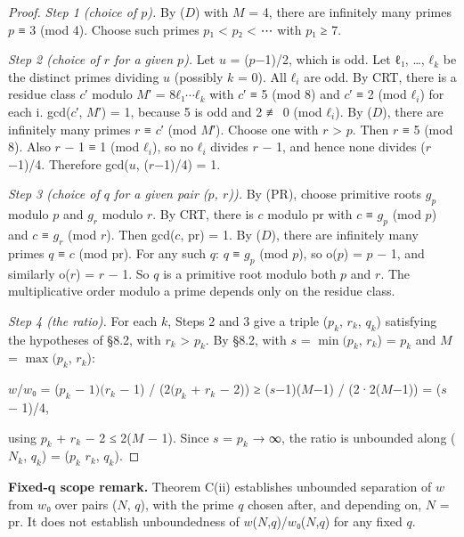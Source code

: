 \documentclass[pdflatex,sn-mathphys-num]{sn-jnl}
\theoremstyle{thmstyleone}
\theoremstyle{thmstylethree}
\begin{document}
\begin{proof}[Proof]

\emph{Step 1 (choice of \(p\)).} By (\(D\)) with \(M\) = 4, there are infinitely many primes \(p\) ≡ 3 (mod 4). Choose such primes \(p\)₁ \textless{} \(p\)₂ \textless{} ⋯ with \(p\)₁ ≥ 7.

\emph{Step 2 (choice of \(r\) for a given \(p\)).} Let \(u\) = (\(p\)−1)/2, which is odd. Let ℓ₁, \ldots, \(ℓ_k\) be the distinct primes dividing \(u\) (possibly \(k\) = 0). All \(ℓ_i\) are odd. By CRT, there is a residue class \(c\)′ modulo \(M\)′ = \(8ℓ₁⋯ℓ_k\) with \(c\)′ ≡ 5 (mod 8) and \(c\)′ ≡ 2 (mod \(ℓ_i\)) for each i. gcd(\(c\)′, \(M\)′) = 1, because 5 is odd and 2 ≢ 0 (mod \(ℓ_i\)). By (\(D\)), there are infinitely many primes \(r\) ≡ \(c\)′ (mod \(M\)′). Choose one with \(r\) \textgreater{} \(p\). Then \(r\) ≡ 5 (mod 8). Also \(r\) − 1 ≡ 1 (mod \(ℓ_i\)), so no \(ℓ_i\) divides \(r\) − 1, and hence none divides (\(r\)−1)/4. Therefore gcd(\(u\), (\(r\)−1)/4) = 1.

\emph{Step 3 (choice of \(q\) for a given pair (\(p\), \(r\))).} By (PR), choose primitive roots \(g_p\) modulo \(p\) and \(g_r\) modulo \(r\). By CRT, there is \(c\) modulo pr with \(c\) ≡ \(g_p\) (mod \(p\)) and \(c\) ≡ \(g_r\) (mod \(r\)). Then gcd(\(c\), pr) = 1. By (\(D\)), there are infinitely many primes \(q\) ≡ \(c\) (mod pr). For any such \(q\): \(q\) ≡ \(g_p\) (mod \(p\)), so o(\(p\)) = \(p\) − 1, and similarly o(\(r\)) = \(r\) − 1. So \(q\) is a primitive root modulo both \(p\) and \(r\). The multiplicative order modulo a prime depends only on the residue class.

\emph{Step 4 (the ratio).} For each \(k\), Steps 2 and 3 give a triple (\(p_k\), \(r_k\), \(q_k\)) satisfying the hypotheses of §8.2, with \(r_k\) \textgreater{} \(p_k\). By §8.2, with \(s\) = \(\operatorname{min}(p_k\), \(r_k\)) = \(p_k\) and \(M\) = \(\operatorname{max}(p_k\), \(r_k\)):

\begin{center}\(w\)/\(w\)₀ = (\(p_k\) − \(1)(r_k\) − 1) / (\(2(p_k\) + \(r_k\) − 2)) ≥ (\(s\)−1)(\(M\)−1) / (2·2(\(M\)−1)) = (\(s\) − 1)/4,\end{center}

using \(p_k\) + \(r_k\) − 2 ≤ 2(\(M\) − 1).
Since \(s\) = \(p_k\) → ∞, the ratio is unbounded along (\(N_k\), \(q_k\)) = (\(p_k\) \(r_k\), \(q_k\)).

\end{proof}

\textbf{Fixed-q scope remark.} Theorem C(ii) establishes unbounded separation of \(w\) from \(w\)₀ over pairs (\(N\), \(q\)), with the prime \(q\) chosen after, and depending on, \(N\) = pr. It does not establish unboundedness of \(w\)(\(N\),\(q\))/\(w\)₀(\(N\),\(q\)) for any fixed \(q\).
\end{document}

